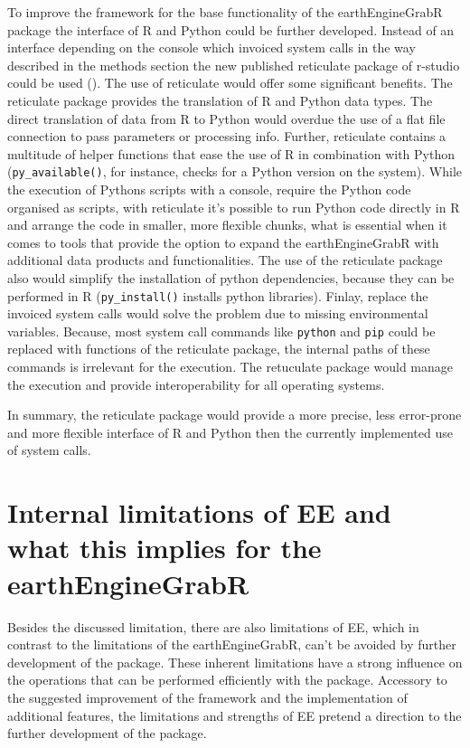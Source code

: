 To improve the framework for the base functionality of the earthEngineGrabR package the interface of R and Python could be further developed. Instead of an interface depending on the console which invoiced system calls in the way described in the methods section the new published reticulate package of r-studio could be used (\cite{reticulate}). The use of reticulate would offer some significant benefits. The reticulate package provides the translation of R and Python data types. The direct translation of data from R to Python would overdue the use of a flat file connection to pass parameters or processing info. Further, reticulate contains a multitude of helper functions that ease the use of R in combination with Python (\texttt{py\_available()}, for instance, checks for a Python version on the system). While the execution of Pythons scripts with a console, require the Python code organised as scripts, with reticulate it's possible to run Python code directly in R and arrange the code in smaller, more flexible chunks, what is essential when it comes to tools that provide the option to expand the earthEngineGrabR with additional data products and functionalities. The use of the reticulate package also would simplify the installation of python dependencies, because they can be performed in R (\texttt{py\_install()} installs python libraries). Finlay, replace the invoiced system calls would solve the problem due to missing environmental variables. Because, most system call commands like \texttt{python} and \texttt{pip} could be replaced with functions of the reticulate package, the internal paths of these commands is irrelevant for the execution. The retuculate package would manage the execution and provide interoperability for all operating systems.

In summary, the reticulate package would provide a more precise, less error-prone and more flexible interface of R and Python then the currently implemented use of system calls.

\section{Internal limitations of EE and what this implies for the earthEngineGrabR}

Besides the discussed limitation, there are also limitations of EE, which in contrast to the limitations of the earthEngineGrabR, can't be avoided by further development of the package. 
These inherent limitations have a strong influence on the operations that can be performed efficiently with the package.
Accessory to the suggested improvement of the framework and the
implementation of additional features, the limitations and strengths of EE pretend a direction to the further development of the package.


